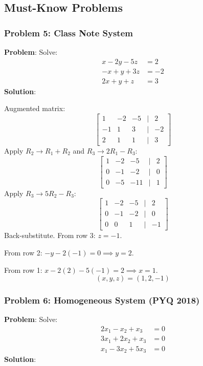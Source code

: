 \documentclass[
]{article}
\begin{document}
\subsection{Must-Know Problems}\label{must-know-problems-1}

\subsubsection{Problem 5: Class Note
System}\label{problem-5-class-note-system}

\textbf{Problem}: Solve:
\[
\begin{aligned}
x - 2y - 5z &= 2 \\
-x + y + 3z &= -2 \\
2x + y + z &= 3
\end{aligned}
\]
\textbf{Solution}:

Augmented matrix:
\[
\begin{bmatrix}
1 & -2 & -5 & | & 2 \\
-1 & 1 & 3 & | & -2 \\
2 & 1 & 1 & | & 3
\end{bmatrix}
\]
Apply \(R_2 \to R_1 + R_2\) and \(R_3 \to 2R_1 - R_3\):
\[
\begin{bmatrix}
1 & -2 & -5 & | & 2 \\
0 & -1 & -2 & | & 0 \\
0 & -5 & -11 & | & 1
\end{bmatrix}
\]
Apply \(R_3 \to 5R_2 - R_3\):
\[
\begin{bmatrix}
1 & -2 & -5 & | & 2 \\
0 & -1 & -2 & | & 0 \\
0 & 0 & 1 & | & -1
\end{bmatrix}
\]
Back-substitute. From row 3: \(z = -1\).

From row 2: \(-y - 2(-1) = 0 \implies y = 2\).

From row 1: \(x - 2(2) - 5(-1) = 2 \implies x = 1\).
\[
(x, y, z) = (1, 2, -1)
\]

\subsubsection{Problem 6: Homogeneous System (PYQ
2018)}\label{problem-6-homogeneous-system-pyq-2018}

\textbf{Problem}: Solve:
\[
\begin{aligned}
2x_1 - x_2 + x_3 &= 0 \\
3x_1 + 2x_2 + x_3 &= 0 \\
x_1 - 3x_2 + 5x_3 &= 0
\end{aligned}
\]
\textbf{Solution}:
\end{document}
